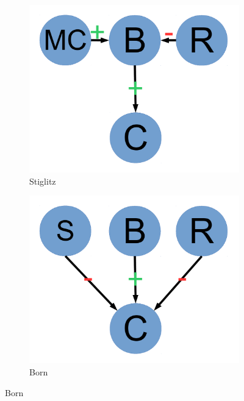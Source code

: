 \documentclass[12pt]{article}
\begin{document}
\begin{figure}
\begin{subfigure}[b]{0.2\textwidth}
                \label{fig:becker}
        \end{subfigure}
        \begin{subfigure}[b]{0.2\textwidth}
                \includegraphics[width=\textwidth]{stiglitz.pdf}
                \caption{\footnotesize Stiglitz}
                \label{fig:stiglitz}
        \end{subfigure}
        \begin{subfigure}[b]{0.2\textwidth}
                \includegraphics[width=\textwidth]{born.pdf}
                \caption{\footnotesize Born}
                \label{fig:born}
        \end{subfigure}

\end{figure}
\end{document}
